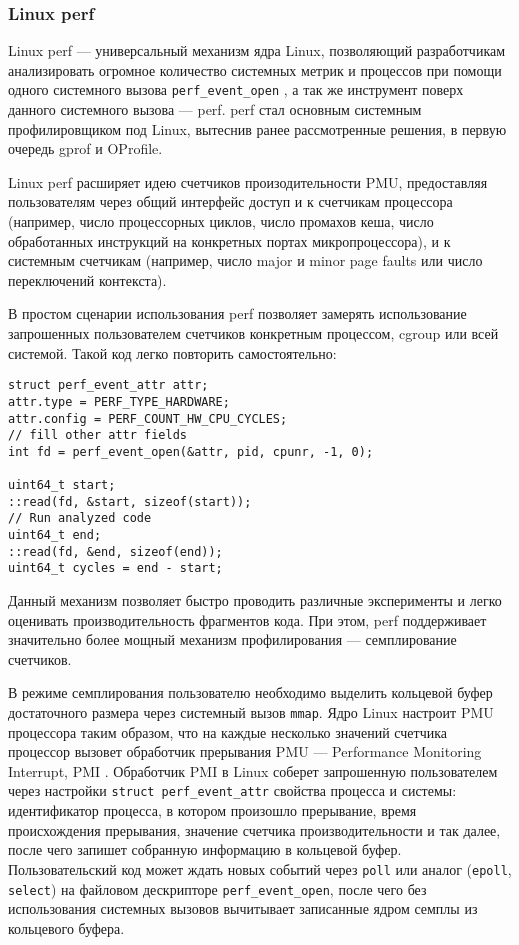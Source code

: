 \subsubsection{Linux perf} \label{sec:perf}
Linux perf \cite{perf} --- универсальный механизм ядра Linux, позволяющий разработчикам анализировать огромное количество системных метрик
и процессов при помощи одного системного вызова \verb!perf_event_open! \cite{perf:syscall},
а так же инструмент поверх данного системного вызова --- perf.
perf стал основным системным профилировщиком под Linux, вытеснив ранее рассмотренные решения, в первую очередь gprof и OProfile.

Linux perf расширяет идею счетчиков произодительности PMU, предоставляя пользователям через общий интерфейс доступ и к счетчикам
процессора (например, число процессорных циклов, число промахов кеша, число обработанных инструкций на конкретных портах микропроцессора),
и к системным счетчикам (например, число major и minor page faults или число переключений контекста).

В простом сценарии использования perf позволяет замерять использование запрошенных пользователем счетчиков конкретным процессом,
cgroup \cite{cgroup} или всей системой.
Такой код легко повторить самостоятельно:
\begin{verbatim}
struct perf_event_attr attr;
attr.type = PERF_TYPE_HARDWARE;
attr.config = PERF_COUNT_HW_CPU_CYCLES;
// fill other attr fields
int fd = perf_event_open(&attr, pid, cpunr, -1, 0);

uint64_t start;
::read(fd, &start, sizeof(start));
// Run analyzed code
uint64_t end;
::read(fd, &end, sizeof(end));
uint64_t cycles = end - start;
\end{verbatim}

Данный механизм позволяет быстро проводить различные эксперименты и легко оценивать производительность фрагментов кода.
При этом, perf поддерживает значительно более мощный механизм профилирования --- семплирование счетчиков.

В режиме семплирования пользователю необходимо выделить кольцевой буфер достаточного размера через системный вызов \verb!mmap!.
Ядро Linux настроит PMU процессора таким образом, что на каждые несколько значений счетчика процессор вызовет обработчик прерывания
PMU --- Performance Monitoring Interrupt, PMI \cite{linux:pmi}.
Обработчик PMI в Linux соберет запрошенную пользователем через настройки \verb!struct perf_event_attr! свойства процесса и системы:
идентификатор процесса, в котором произошло прерывание, время происхождения прерывания, значение счетчика производительности и так далее,
после чего запишет собранную информацию в кольцевой буфер. Пользовательский код может ждать новых событий через \verb!poll! 
или аналог (\verb!epoll!, \verb!select!) на файловом дескрипторе \verb!perf_event_open!, после чего без использования системных
вызовов вычитывает записанные ядром семплы из кольцевого буфера.

